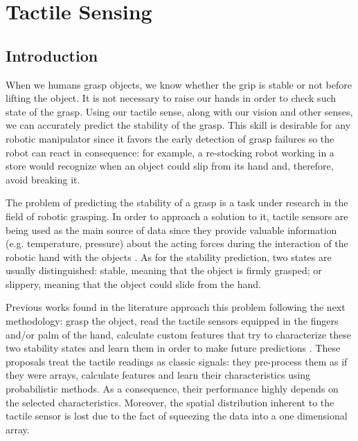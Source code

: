 \chapter{Tactile Sensing}
\label{cha:tactile}

\begin{chapterabstract}
    \lipsum[2]
\end{chapterabstract}

\clearpage

\section{Introduction}
\label{cha:tactile:sec:introduction}

When we humans grasp objects, we know whether the grip is stable or not before lifting the object. It is not necessary to raise our hands in order to check such state of the grasp. Using our tactile sense, along with our vision and other senses, we can accurately predict the stability of the grasp. This skill is desirable for any robotic manipulator since it favors the early detection of grasp failures so the robot can react in consequence: for example, a re-stocking robot working in a store would recognize when an object could slip from its hand and, therefore, avoid breaking it.

The problem of predicting the stability of a grasp is a task under research in the field of robotic grasping. In order to approach a solution to it, tactile sensors are being used as the main source of data since they provide valuable information (e.g. temperature, pressure) about the acting forces during the interaction of the robotic hand with the objects \cite{Kappassov2015}. As for the stability prediction, two states are usually distinguished: stable, meaning that the object is firmly grasped; or slippery, meaning that the object could slide from the hand.

Previous works found in the literature approach this problem following the next methodology: grasp the object, read the tactile sensors equipped in the fingers and/or palm of the hand, calculate custom features that try to characterize these two stability states and learn them in order to make future predictions \cite{Li2014b,Dang2014,Su2015b,Veiga2015}. These proposals treat the tactile readings as classic signals: they pre-process them as if they were arrays, calculate features and learn their characteristics using probabilistic methods. As a consequence, their performance highly depends on the selected characteristics. Moreover, the spatial distribution inherent to the tactile sensor is lost due to the fact of squeezing the data into a one dimensional array.

